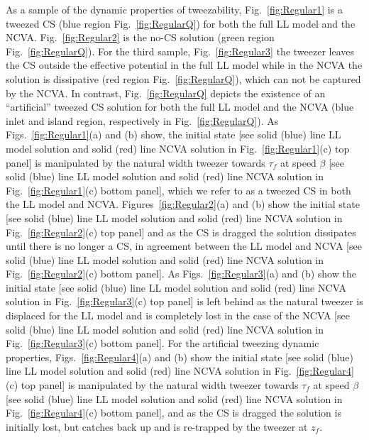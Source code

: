 \documentclass[aps,floatfix,showpacs,preprintnumbers,twocolumn,nofootinbib]{revtex4}
\begin{document}
As a sample of the dynamic properties of tweezability, Fig.~\ref{fig:Regular1} is a tweezed CS (blue region Fig.~\ref{fig:RegularQ}) for both the full LL model and the NCVA.  Fig.~\ref{fig:Regular2} is the no-CS solution  (green region Fig.~\ref{fig:RegularQ}).  For the third sample, Fig.~\ref{fig:Regular3} the tweezer leaves the CS outside the effective potential in the full LL model while in the NCVA the solution is dissipative (red region Fig.~\ref{fig:RegularQ}), which can not be captured by the NCVA.  In contrast, Fig.~\ref{fig:RegularQ} depicts the existence of an ``artificial'' tweezed CS solution for both the full LL model and the NCVA (blue inlet and island region, respectively in Fig.~\ref{fig:RegularQ}).  As Figs.~\ref{fig:Regular1}(a) and (b) show, the initial state [see solid (blue) line LL model solution and solid (red) line NCVA solution in Fig.~\ref{fig:Regular1}(c) top panel] is manipulated by the natural width tweezer towards $\tau_f$ at speed $\beta$ [see solid (blue) line LL model solution  and solid (red) line NCVA solution in Fig.~\ref{fig:Regular1}(c) bottom panel], which we refer to as a tweezed CS in both the LL model and NCVA.  Figures~\ref{fig:Regular2}(a) and (b) show the initial state [see solid (blue) line LL model solution and solid (red) line NCVA solution in Fig.~\ref{fig:Regular2}(c) top panel] and as the CS is dragged the solution dissipates until there is no longer a CS, in agreement between the LL model and NCVA  [see solid (blue) line LL model solution and solid (red) line NCVA solution in Fig.~\ref{fig:Regular2}(c) bottom panel].   As Figs.~\ref{fig:Regular3}(a) and (b) show the initial state [see solid (blue) line LL model solution and solid (red) line NCVA solution in Fig.~\ref{fig:Regular3}(c) top panel] is left behind as the natural tweezer is displaced for the LL model and is completely lost in the case of the NCVA  [see solid (blue) line LL model solution  and solid (red) line NCVA solution in Fig.~\ref{fig:Regular3}(c) bottom panel].  For the artificial tweezing dynamic properties, Figs.~\ref{fig:Regular4}(a) and (b) show the initial state [see solid (blue) line LL model solution and solid (red) line NCVA solution in Fig.~\ref{fig:Regular4}(c) top panel] is manipulated by the natural width tweezer towards $\tau_f$ at speed $\beta$ [see solid (blue) line LL model solution and solid (red) line NCVA solution in Fig.~\ref{fig:Regular4}(c) bottom panel], and as the CS is dragged the solution is initially lost, but catches back up and is re-trapped by the tweezer at $z_f$. 
\end{document}
